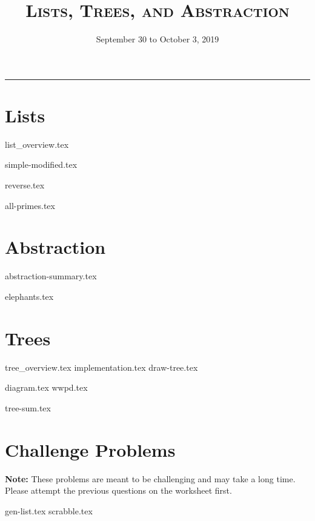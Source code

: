 \documentclass{exam}
\title{\textsc{Lists, Trees, and Abstraction}}
\date{September 30 to October 3, 2019}
\begin{document}
\maketitle
\rule{\textwidth}{0.15em}
\fontsize{12}{15}\selectfont


\section{Lists}
{list_overview.tex}
\begin{questions}
{simple-modified.tex}

\begin{blocksection}
{reverse.tex}
\end{blocksection}

\begin{blocksection}
{all-primes.tex}
\end{blocksection}
\end{questions}

\newpage
\section{Abstraction}
{abstraction-summary.tex}
\begin{questions}
{elephants.tex}

\end{questions}

\newpage
\section{Trees}
{tree_overview.tex}
{implementation.tex}
{draw-tree.tex}
\newpage
\begin{questions}
{diagram.tex}
{wwpd.tex}

{tree-sum.tex}

\end{questions}

\newpage
\section{Challenge Problems}
\textbf{Note:} These problems are meant to be challenging and may take a long time. Please attempt the previous questions on the worksheet first.
\begin{questions}
{gen-list.tex}
\newpage
{scrabble.tex}
\end{questions}
\end{document}
